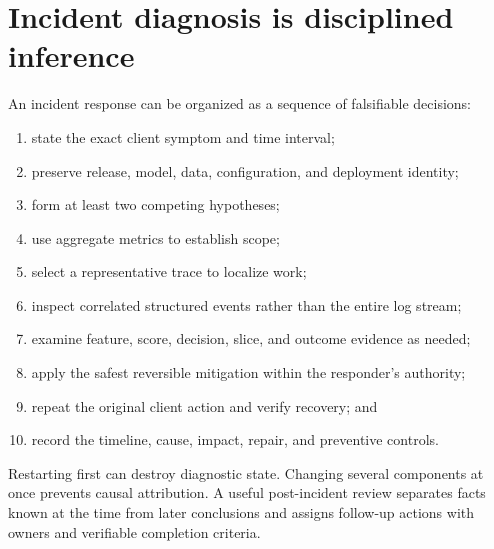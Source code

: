 \section{Incident diagnosis is disciplined inference}

An incident response can be organized as a sequence of falsifiable decisions:

\begin{enumerate}
  \item state the exact client symptom and time interval;
  \item preserve release, model, data, configuration, and deployment identity;
  \item form at least two competing hypotheses;
  \item use aggregate metrics to establish scope;
  \item select a representative trace to localize work;
  \item inspect correlated structured events rather than the entire log stream;
  \item examine feature, score, decision, slice, and outcome evidence as needed;
  \item apply the safest reversible mitigation within the responder's authority;
  \item repeat the original client action and verify recovery; and
  \item record the timeline, cause, impact, repair, and preventive controls.
\end{enumerate}

Restarting first can destroy diagnostic state. Changing several components at
once prevents causal attribution. A useful post-incident review separates facts
known at the time from later conclusions and assigns follow-up actions with
owners and verifiable completion criteria.

